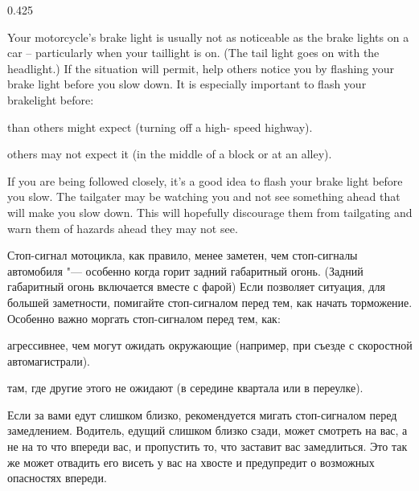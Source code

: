 

\begin{langblock}{0.425}
	\begin{eng}
	
	Your motorcycle's brake light is usually not as noticeable as the brake lights on a car -- particularly when your taillight is on. (The tail light goes on with the headlight.) If the situation will permit, help others notice you by flashing your brake light before you slow down. It is especially important to flash your brakelight before:
	\begin{description} [noitemsep]
	\item [You slow more quickly] than others might expect (turning off a high- speed highway).
	\item [You slow where] others may not expect it (in the middle of a block or at an alley).
	\end{description}
		
	If you are being followed closely, it's a good idea to flash your brake light before you slow. The tailgater may be watching you and not see something ahead that will make you slow down. This will hopefully discourage them from tailgating and warn them of hazards ahead they may not see.
	\end{eng}
	\begin{rus}
		Стоп-сигнал мотоцикла, как правило, менее заметен, чем стоп-сигналы автомобиля "--- особенно когда горит задний габаритный огонь. (Задний габаритный огонь включается вместе с фарой) Если позволяет ситуация, для большей заметности, помигайте стоп-сигналом перед тем, как начать торможение. Особенно важно моргать стоп-сигналом перед тем, как:
		
		\begin{description} [noitemsep]
			\item [Вы замедляетесь] агрессивнее, чем могут ожидать окружающие (например, при съезде с скоростной автомагистрали).
			\item [Вы замедляетесь] там, где другие этого не ожидают (в середине квартала или в переулке).
		\end{description}
		
		Если за вами едут слишком близко, рекомендуется мигать стоп-сигналом перед замедлением. Водитель, едущий слишком близко сзади, может смотреть на вас, а не на то что  впереди вас, и пропустить то, что заставит вас замедлиться. Это так же может отвадить его висеть у вас на хвосте и предупредит о возможных опасностях впереди.
\end{rus}
\end{langblock}



